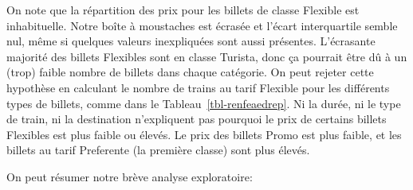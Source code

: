 \documentclass[
  11pt,
  letterpaper,
]{scrbook}
\theoremstyle{definition}
\theoremstyle{remark}
\begin{document}
\begin{table}

\caption{\label{tbl-renfeaedrep}Nombre de billets au tarif Flexible
selon le prix de vente.}


\end{table}%

On note que la répartition des prix pour les billets de classe Flexible
est inhabituelle. Notre boîte à moustaches est écrasée et l'écart
interquartile semble nul, même si quelques valeurs inexpliquées sont
aussi présentes. L'écrasante majorité des billets Flexibles sont en
classe Turista, donc ça pourrait être dû à un (trop) faible nombre de
billets dans chaque catégorie. On peut rejeter cette hypothèse en
calculant le nombre de trains au tarif Flexible pour les différents
types de billets, comme dans le Tableau~\ref{tbl-renfeaedrep}. Ni la
durée, ni le type de train, ni la destination n'expliquent pas pourquoi
le prix de certains billets Flexibles est plus faible ou élevés. Le prix
des billets Promo est plus faible, et les billets au tarif Preferente
(la première classe) sont plus élevés.

On peut résumer notre brève analyse exploratoire:
\end{document}
